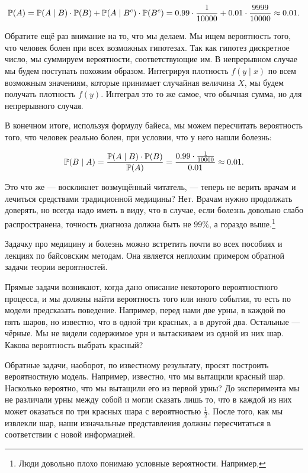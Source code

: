 \begin{multline*}
\mathbb{P}(A)  = \mathbb{P}(A\mid B) \cdot \mathbb{P}(B) + \mathbb{P}(A \mid B^{c})  \cdot \mathbb{P}(B^{c})  = 0.99 \cdot \frac{1}{10000} + 0.01 \cdot \frac{9999}{10000} \approx 0.01.
\end{multline*}

Обратите ещё раз внимание на то, что мы делаем. Мы ищем вероятность того, что человек болен при всех возможных гипотезах. Так как гипотез дискретное число, мы суммируем вероятности, соответствующие им.  В непрерывном случае мы будем поступать похожим образом.  Интегрируя плотность $f(y \mid x)$ по всем возможным значениям, которые принимает случайная величина $X$, мы будем получать плотность $f(y)$. Интеграл это то же самое, что обычная сумма, но для непрерывного случая.

В конечном итоге, используя формулу байеса, мы можем пересчитать вероятность того, что человек реально болен, при условии, что у него нашли болезнь:

\[  \mathbb{P}(B \mid A) = \frac{ \mathbb{P}(A \mid B)\cdot \mathbb{P}(B) }{\mathbb{P}(A)}  = \frac{0.99 \cdot \frac{1}{10000}}{0.01} \approx 0.01. \]

Это что же --- воскликнет возмущённый читатель, --- теперь не верить врачам и лечиться средствами традиционной медицины? Нет. Врачам нужно продолжать доверять, но всегда надо иметь в виду, что в случае, если болезнь довольно слабо распространена, точность диагноза должна быть не $99\%$, а гораздо выше.\footnote{Люди довольно плохо понимаю условные вероятности. Например, }

Задачку про медицину и болезнь можно встретить почти во всех пособиях и лекциях по байсовским методам. Она является неплохим примером обратной задачи теории вероятностей. 

Прямые задачи возникают, когда дано описание некоторого вероятностного процесса, и мы должны найти вероятность того или иного события, то есть по модели предсказать поведение. Например, перед нами две урны, в каждой по пять шаров, но известно, что в одной три красных, а в другой два. Остальные --- чёрные.  Мы не видели содержимое урн и вытаскиваем из одной из них шар. Какова вероятность выбрать красный? 

Обратные задачи, наоборот, по известному результату, просят построить вероятностную модель.  Например, известно, что мы вытащили красный шар. Насколько вероятно, что мы вытащили его из первой урны?  До эксперимента мы не различали урны между собой и могли сказать лишь то, что в каждой из них может оказаться по три красных шара с вероятностью $\frac{1}{2}$. После того, как мы извлекли шар,  наши изначальные представления должны пересчитаться в соответствии с новой информацией.

